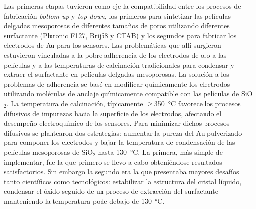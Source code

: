 Las primeras etapas tuvieron como eje la compatibilidad entre los procesos de fabricación \textit{bottom-up} y \textit{top-down}, los primeros para sintetizar las películas delgadas mesoporosas de diferentes tamaños de poros utilizando diferentes surfactante (Pluronic F127, Brij58 y CTAB) y los segundos para fabricar los electrodos de Au para los sensores. Las problemáticas que allí surgieron estuvieron vinculadas a la pobre adherencia de los electrodos de oro a las películas y a las temperaturas de calcinación tradicionales para condensar y extraer el surfactante en películas delgadas mesoporosas. La solución a los problemas de adherencia se basó en modificar químicamente los electrodos utilizando moléculas de anclaje químicamente compatible con las películas de SiO$_2$.  La temperatura de calcinación, típicamente $\geq$\SI{350}{\celsius} favorece los procesos difusivos de impurezas hacia la superficie de los electrodos, afectando el desempeño electroquímico de los sensores. Para minimizar dichos procesos difusivos se plantearon dos estrategias: aumentar la pureza del Au pulverizado para componer los electrodos y bajar la temperatura de condensación de las películas mesoporosas de SiO$_2$ hasta \SI{130}{\celsius}. La primera, más simple de implementar, fue la que primero se llevo a cabo obteniéndose resultados satisfactorios. Sin embargo la segundo era la que presentaba mayores desafíos tanto científicos como tecnológicos: estabilizar la estructura del cristal líquido, condensar el óxido seguido de un proceso de extracción del surfactante manteniendo la temperatura pode debajo de \SI{130}{\celsius}. 

